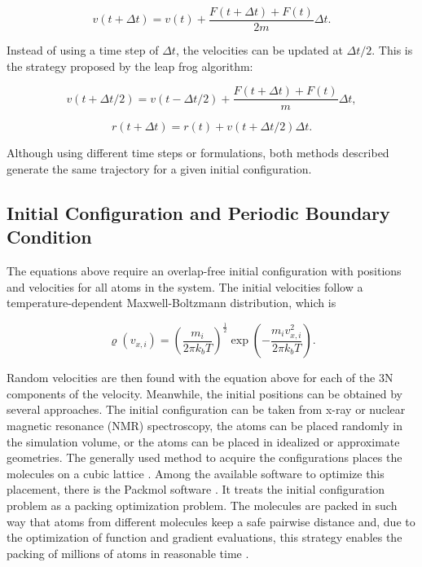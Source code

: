 \begin{equation}
v(t+ \Delta t) = v(t) +\frac{F(t+ \Delta t) +F(t)}{2m} \Delta t .
\end{equation}

Instead of using a time step of $\Delta t$, the velocities can be updated at $\Delta t /2$. This is the strategy proposed by the leap frog algorithm:

\begin{equation}
v(t+ \Delta t /2) = v(t- \Delta t /2) +\frac{F(t+ \Delta t) +F(t)}{m} \Delta t ,
\end{equation}

\begin{equation}
r(t+ \Delta t) = r(t) +v(t+ \Delta t /2) \Delta t .
\end{equation}

Although using different time steps or formulations, both methods described generate the same trajectory for a given initial configuration.

\subsection{Initial Configuration and Periodic Boundary Condition}

The equations above require an overlap-free initial configuration with positions and velocities for all atoms in the system. The initial velocities follow a temperature-dependent Maxwell-Boltzmann distribution, which is

\begin{equation}
\varrho (v_{x,i}) = \left (\frac{m_{i}}{2 \pi k_{b} T} \right )^{\frac{1}{2}} \exp \left (-\frac{m_{i}v_{x,i}^2}{2 \pi k_{b} T} \right) .
\end{equation}

Random velocities are then found with the equation above for each of the 3N components of the velocity. Meanwhile, the initial positions can be obtained by several approaches. The initial configuration can be taken from x-ray or nuclear magnetic resonance (NMR) spectroscopy, the atoms can be placed randomly in the simulation volume, or the atoms can be placed in idealized or approximate geometries. The generally used method to acquire the configurations places the molecules on a cubic lattice \cite{shell2015}.  Among the available software to optimize this placement, there is the Packmol software \cite{packmol}. It treats the initial configuration problem as a packing optimization problem. The molecules are packed in such way that atoms from different molecules keep a safe pairwise distance and, due to the optimization of function and gradient evaluations, this strategy enables the packing of millions of atoms in reasonable time \cite{packmol}.   

